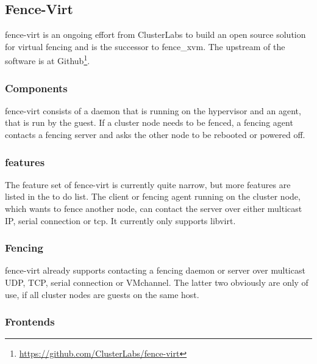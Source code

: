 \subsection{Fence-Virt}
fence-virt is an ongoing effort from ClusterLabs to build an open source solution
for virtual fencing and is the successor to fence\_xvm. 
The upstream of the software is at Github\footnote{\url{https://github.com/ClusterLabs/fence-virt}}.
\subsubsection{Components}
fence-virt consists of a daemon that is running on the hypervisor and 
an agent, that is run by the guest. If a cluster node needs to be fenced,
a fencing agent contacts a fencing server and asks the other node to
be rebooted or powered off.
\subsubsection{features}
The feature set of fence-virt is currently quite narrow, but more features are listed
in the to do list.
The client or fencing agent running on the cluster node, which wants to fence
another node, can contact the server over either multicast IP, serial connection or
tcp. It currently only supports libvirt.
\subsubsection{Fencing}
fence-virt already supports contacting a fencing daemon or server over
multicast UDP, TCP, serial connection or VMchannel. The latter two obviously are only
of use, if all cluster nodes are guests on the same host.
\subsubsection{Frontends}
